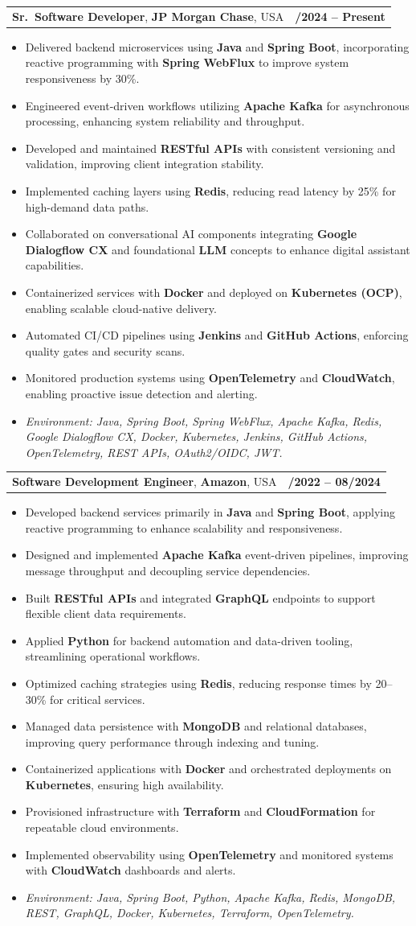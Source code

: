\documentclass[letterpaper,11pt]{article}
\makeatletter
\newcommand{\resumeItem}[1]{
  \item\footnotesize{
    {#1 \vspace{-2pt}}
  }
}
\newcommand{\resumeSubheading}[4]{
  \vspace{-2pt}\item
    \begin{tabular*}{1.0\textwidth}[t]{l@{\extracolsep{\fill}}r}
      \textbf{\fontsize{10pt}{14pt}\selectfont #3}, \textbf{\fontsize{10pt}{14pt}\selectfont #1}, \fontsize{10pt}{14pt}\selectfont #4 & \textbf{\fontsize{10pt}{14pt}\selectfont #2} \\
    \end{tabular*}\vspace{-7pt}
}
\newcommand{\resumeItemListStart}{\begin{itemize}[leftmargin=*]}
\newcommand{\resumeItemListEnd}{\end{itemize}\vspace{-5pt}}
\makeatother
\begin{document}
\resumeSubheading
{JP Morgan Chase}{09/2024 -- Present}
{Sr.\ Software Developer}{USA}
\resumeItemListStart
  \resumeItem{Delivered backend microservices using \textbf{Java} and \textbf{Spring Boot}, incorporating reactive programming with \textbf{Spring WebFlux} to improve system responsiveness by 30\%.}
  \resumeItem{Engineered event-driven workflows utilizing \textbf{Apache Kafka} for asynchronous processing, enhancing system reliability and throughput.}
  \resumeItem{Developed and maintained \textbf{RESTful APIs} with consistent versioning and validation, improving client integration stability.}
  \resumeItem{Implemented caching layers using \textbf{Redis}, reducing read latency by 25\% for high-demand data paths.}
  \resumeItem{Collaborated on conversational AI components integrating \textbf{Google Dialogflow CX} and foundational \textbf{LLM} concepts to enhance digital assistant capabilities.}
  \resumeItem{Containerized services with \textbf{Docker} and deployed on \textbf{Kubernetes (OCP)}, enabling scalable cloud-native delivery.}
  \resumeItem{Automated CI/CD pipelines using \textbf{Jenkins} and \textbf{GitHub Actions}, enforcing quality gates and security scans.}
  \resumeItem{Monitored production systems using \textbf{OpenTelemetry} and \textbf{CloudWatch}, enabling proactive issue detection and alerting.}
  \resumeItem{\textit{Environment: Java, Spring Boot, Spring WebFlux, Apache Kafka, Redis, Google Dialogflow CX, Docker, Kubernetes, Jenkins, GitHub Actions, OpenTelemetry, REST APIs, OAuth2/OIDC, JWT.}}
\resumeItemListEnd

\resumeSubheading
{Amazon}{10/2022 -- 08/2024}
{Software Development Engineer}{USA}
\resumeItemListStart
  \resumeItem{Developed backend services primarily in \textbf{Java} and \textbf{Spring Boot}, applying reactive programming to enhance scalability and responsiveness.}
  \resumeItem{Designed and implemented \textbf{Apache Kafka} event-driven pipelines, improving message throughput and decoupling service dependencies.}
  \resumeItem{Built \textbf{RESTful APIs} and integrated \textbf{GraphQL} endpoints to support flexible client data requirements.}
  \resumeItem{Applied \textbf{Python} for backend automation and data-driven tooling, streamlining operational workflows.}
  \resumeItem{Optimized caching strategies using \textbf{Redis}, reducing response times by 20--30\% for critical services.}
  \resumeItem{Managed data persistence with \textbf{MongoDB} and relational databases, improving query performance through indexing and tuning.}
  \resumeItem{Containerized applications with \textbf{Docker} and orchestrated deployments on \textbf{Kubernetes}, ensuring high availability.}
  \resumeItem{Provisioned infrastructure with \textbf{Terraform} and \textbf{CloudFormation} for repeatable cloud environments.}
  \resumeItem{Implemented observability using \textbf{OpenTelemetry} and monitored systems with \textbf{CloudWatch} dashboards and alerts.}
  \resumeItem{\textit{Environment: Java, Spring Boot, Python, Apache Kafka, Redis, MongoDB, REST, GraphQL, Docker, Kubernetes, Terraform, OpenTelemetry.}}
\resumeItemListEnd
\end{document}

